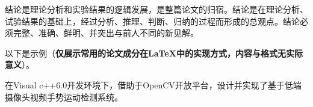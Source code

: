
\begin{conclusion}

结论是理论分析和实验结果的逻辑发展，是整篇论文的归宿。结论是在理论分析、试验结果的基础上，经过分析、推理、判断、归纳的过程而形成的总观点。结论必须完整、准确、鲜明、并突出与前人不同的新见解。

以下是示例（{\bf 仅展示常用的论文成分在LaTeX中的实现方式，内容与格式无实际意义}）。

在Visual c++6.0开发环境下，借助于OpenCV开放平台，设计并实现了基于低端摄像头视频手势运动检测系统。

\end{conclusion}


